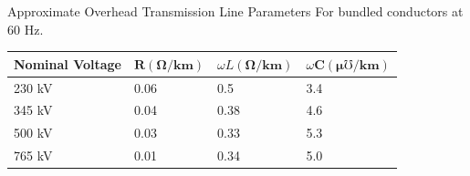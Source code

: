 \begin{frame}{Approximate Overhead Transmission Line Parameters}
For bundled conductors at 60 Hz.
\begin{table}
\begin{tabular}{llll}
\hline Nominal Voltage & $\boldsymbol{R}(\boldsymbol{\Omega} / \mathbf{k m})$ & $\omega L(\boldsymbol{\Omega} / \mathbf{k m})$ & $\omega \boldsymbol{C}(\boldsymbol{\mu} \boldsymbol{\mho} / \mathbf{k m})$ \\
\hline 230 kV & 0.06 & 0.5 & 3.4 \\
345 kV & 0.04 & 0.38 & 4.6 \\
500 kV & 0.03 & 0.33 & 5.3 \\
765 kV & 0.01 & 0.34 & 5.0 \\
\hline
\end{tabular}
\end{table}
\end{frame}

